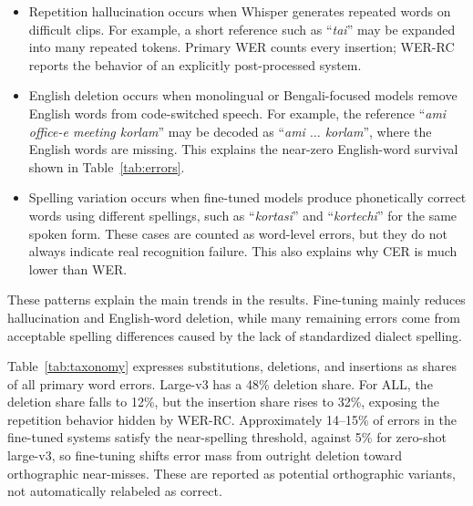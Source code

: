 \documentclass[journal]{IEEEtran}
\begin{document}
\begin{itemize}[leftmargin=*]
\item Repetition hallucination occurs when Whisper generates repeated words on
difficult clips. For example, a short reference such as ``\textit{tai}'' may be
expanded into many repeated tokens. Primary WER counts every insertion; WER-RC
reports the behavior of an explicitly post-processed system.

\item English deletion occurs when monolingual or Bengali-focused models remove English words from code-switched speech. For example, the reference ``\textit{ami office-e meeting korlam}'' may be decoded as ``\textit{ami $\dots$ korlam}'', where the English words are missing. This explains the near-zero English-word survival shown in Table~\ref{tab:errors}.

\item Spelling variation occurs when fine-tuned models produce phonetically correct words using different spellings, such as ``\textit{kortasi}'' and ``\textit{kortechi}'' for the same spoken form. These cases are counted as word-level errors, but they do not always indicate real recognition failure. This also explains why CER is much lower than WER.
\end{itemize}

These patterns explain the main trends in the results. Fine-tuning mainly reduces hallucination and English-word deletion, while many remaining errors come from acceptable spelling differences caused by the lack of standardized dialect spelling.

Table~\ref{tab:taxonomy} expresses substitutions, deletions, and insertions as
shares of all primary word errors. Large-v3 has a 48\% deletion share. For ALL,
the deletion share falls to 12\%, but the insertion share rises to 32\%, exposing
the repetition behavior hidden by WER-RC. Approximately 14--15\% of errors in
the fine-tuned systems satisfy the near-spelling threshold, against 5\% for
zero-shot large-v3, so fine-tuning shifts error mass from outright deletion
toward orthographic near-misses. These are reported as potential orthographic
variants, not automatically relabeled as correct.
\end{document}
